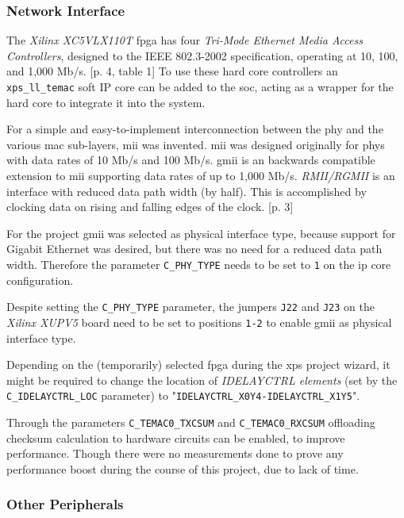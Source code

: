 \subsubsection{Network Interface}

The \textit{Xilinx XC5VLX110T} \gls{fpga} has four \textit{Tri-Mode Ethernet Media Access Controllers}, designed to the IEEE 802.3-2002 specification, operating at 10, 100, and 1,000 Mb/s. \cite{virtex5}[p. 4, table 1] To use these hard core controllers an \texttt{xps\_ll\_temac} soft IP core can be added to the \gls{soc}, acting as a wrapper for the hard core to integrate it into the system.

For a simple and easy-to-implement interconnection between the \gls{phy} and the various \gls{mac} sub-layers, \gls{mii} was invented. \gls{mii} was designed originally for \gls{phy}s with data rates of 10 Mb/s and 100 Mb/s. \gls{gmii} is an backwards compatible extension to \gls{mii} supporting data rates of up to 1,000 Mb/s. \textit{RMII/RGMII} is an interface with reduced data path width (by half). This is accomplished by clocking data on rising and falling edges of the clock. \cite{rgmii}[p. 3]

For the project \gls{gmii} was selected as physical interface type, because support for Gigabit Ethernet was desired, but there was no need for a reduced data path width. Therefore the parameter \texttt{C\_PHY\_TYPE} needs to be set to \texttt{1} on the \gls{ip} core configuration.

Despite setting the \texttt{C\_PHY\_TYPE} parameter, the jumpers \texttt{J22} and \texttt{J23} on the \textit{Xilinx XUPV5} board need to be set to positions \texttt{1-2} to enable \gls{gmii} as physical interface type.

Depending on the (temporarily) selected \gls{fpga} during the \gls{xps} project wizard, it might be required to change the location of \textit{IDELAYCTRL elements} (set by the \texttt{C\_IDELAYCTRL\_LOC} parameter) to "\texttt{IDELAYCTRL\_X0Y4-IDELAYCTRL\_X1Y5}".

Through the parameters \texttt{C\_TEMAC0\_TXCSUM} and \texttt{C\_TEMAC0\_RXCSUM} offloading checksum calculation to hardware circuits can be enabled, to improve performance. Though there were no measurements done to prove any performance boost during the course of this project, due to lack of time.

\subsubsection{Other Peripherals}

